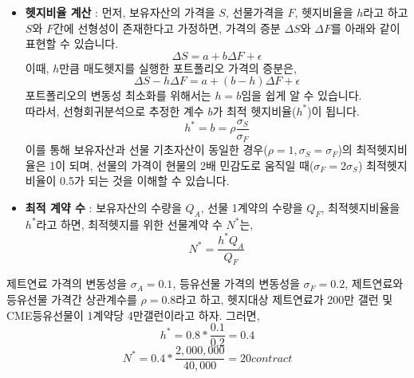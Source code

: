 \documentclass[
  letterpaper,
  DIV=11,
  numbers=noendperiod]{scrreprt}
\begin{document}
\begin{itemize}
\item
  \textbf{헷지비율 계산} : 먼저, 보유자산의 가격을 \(S\), 선물가격을
  \(F\), 헷지비율을 \(h\)라고 하고 \(S\)와 \(F\)간에 선형성이 존재한다고
  가정하면, 가격의 증분 \(\Delta S\)와 \(\Delta F\)를 아래와 같이 표현할
  수 있습니다. \[\Delta S=a+b\Delta F+\epsilon\] 이때, \(h\)만큼
  매도헷지를 실행한 포트폴리오 가격의 증분은,
  \[\Delta S-h\Delta F=a+(b-h)\Delta F+\epsilon\] 포트폴리오의 변동성
  최소화를 위해서는 \(h=b\)임을 쉽게 알 수 있습니다.\\
  따라서, 선형회귀분석으로 추정한 계수 \(b\)가 최적 헷지비율(\(h^*\))이
  됩니다. \[h^*=b=\rho \frac{\sigma _S}{\sigma _F}\] 이를 통해
  보유자산과 선물 기초자산이 동일한
  경우(\(\rho=1, \sigma _S=\sigma _F\))의 최적헷지비율은 1이 되며,
  선물의 가격이 현물의 2배 민감도로 움직일 때(\(\sigma _F=2\sigma _S\))
  최적헷지비율이 0.5가 되는 것을 이해할 수 있습니다.
\item
  \textbf{최적 계약 수} : 보유자산의 수량을 \(Q_A\), 선물 1계약의 수량을
  \(Q_F\), 최적헷지비율을 \(h^*\)라고 하면, 최적헷지를 위한 선물계약 수
  \(N^*\)는, \[N^*=\frac{h^* Q_A}{Q_F}\]
\end{itemize}

\begin{tcolorbox}[enhanced jigsaw, titlerule=0mm, bottomtitle=1mm, left=2mm, title=\textcolor{quarto-callout-note-color}{\faInfo}\hspace{0.5em}{최적헷지비율 및 계약수 예시}, toptitle=1mm, bottomrule=.15mm, colframe=quarto-callout-note-color-frame, breakable, opacityback=0, rightrule=.15mm, opacitybacktitle=0.6, coltitle=black, colback=white, arc=.35mm, colbacktitle=quarto-callout-note-color!10!white, toprule=.15mm, leftrule=.75mm]

제트연료 가격의 변동성을 \(\sigma _A=0.1\), 등유선물 가격의 변동성을
\(\sigma _F=0.2\), 제트연료와 등유선물 가격간 상관계수를
\(\rho = 0.8\)라고 하고, 헷지대상 제트연료가 200만 갤런 및 CME등유선물이
1계약당 4만갤런이라고 하자. 그러면, \[h^*=0.8*\frac{0.1}{0.2}=0.4\]
\[N^*=0.4*\frac{2,000,000}{40,000}=20contract\]

\end{tcolorbox}
\end{document}
